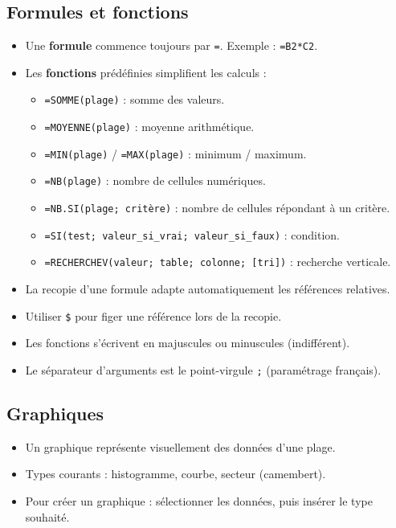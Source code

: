 \subsection{Formules et fonctions}
\begin{itemize}
    \item Une \textbf{formule} commence toujours par \texttt{=}. Exemple : \texttt{=B2*C2}.
    \item Les \textbf{fonctions} prédéfinies simplifient les calculs :
    \begin{itemize}
        \item \texttt{=SOMME(plage)} : somme des valeurs.
        \item \texttt{=MOYENNE(plage)} : moyenne arithmétique.
        \item \texttt{=MIN(plage)} / \texttt{=MAX(plage)} : minimum / maximum.
        \item \texttt{=NB(plage)} : nombre de cellules numériques.
        \item \texttt{=NB.SI(plage; critère)} : nombre de cellules répondant à un critère.
        \item \texttt{=SI(test; valeur\_si\_vrai; valeur\_si\_faux)} : condition.
        \item \texttt{=RECHERCHEV(valeur; table; colonne; [tri])} : recherche verticale.
    \end{itemize}
\end{itemize}

\begin{aretenir}
    \begin{itemize}
        \item La recopie d'une formule adapte automatiquement les références relatives.
        \item Utiliser \texttt{\$} pour figer une référence lors de la recopie.
        \item Les fonctions s'écrivent en majuscules ou minuscules (indifférent).
        \item Le séparateur d'arguments est le point-virgule \texttt{;} (paramétrage français).
    \end{itemize}
\end{aretenir}

\subsection{Graphiques}
\begin{itemize}
    \item Un graphique représente visuellement des données d'une plage.
    \item Types courants : histogramme, courbe, secteur (camembert).
    \item Pour créer un graphique : sélectionner les données, puis insérer le type souhaité.
\end{itemize}

